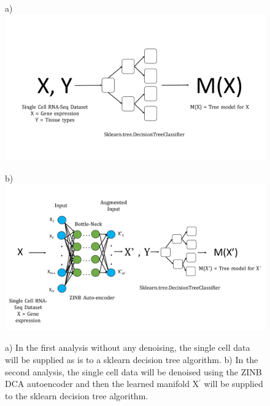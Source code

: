 \begin{figure}
\begin{framed}
\begin{minipage}{\linewidth}
\begin{minipage}[t]{0.48\linewidth}
\vspace{0pt}
\textsf{a)}\\
\includegraphics[width=\linewidth]{without_autoencoding.pdf}
\end{minipage}
\begin{minipage}[t]{0.48\linewidth}
\vspace{0pt}
\textsf{b)}\\
\includegraphics[width=\linewidth]{with_autoencoding.pdf}
\end{minipage}
\end{minipage}
\caption{a) In the first analysis without any denoising, the single cell data will be supplied as is to a sklearn decision tree algorithm. b) In the second analysis, the single cell data will be denoised using the ZINB DCA autoencoder and then the learned manifold X$^{'}$ will be supplied to the sklearn decision tree algorithm.}
\end{framed}
\label{fig1}
\end{figure}

